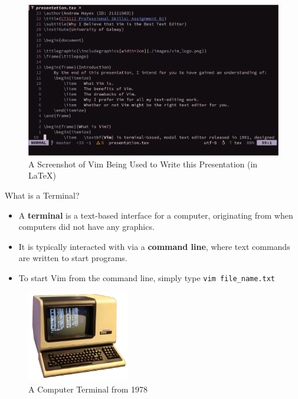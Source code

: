 \documentclass[]{beamer}
\begin{document}
\begin{frame}
    \begin{figure}[h]
        \includegraphics[width=\textwidth]{./images/screenshot.png}
        \caption{A Screenshot of Vim Being Used to Write this Presentation (in {\LaTeX})}
    \end{figure}
\end{frame}

\begin{frame}{What is a Terminal?}
    \begin{itemize}
        \item   A \textbf{terminal} is a text-based interface for a computer, originating from when computers did not
                have any graphics.
        \item   It is typically interacted with via a \textbf{command line}, where text commands are written to start
                programs.
        \item   To start Vim from the command line, simply type \texttt{vim file_name.txt}
    \end{itemize}

    \begin{figure}[h]
        \includegraphics[width=0.4\textwidth]{./images/terminal.png}
        \caption{A Computer Terminal from 1978}
    \end{figure}
\end{frame}
\end{document}
